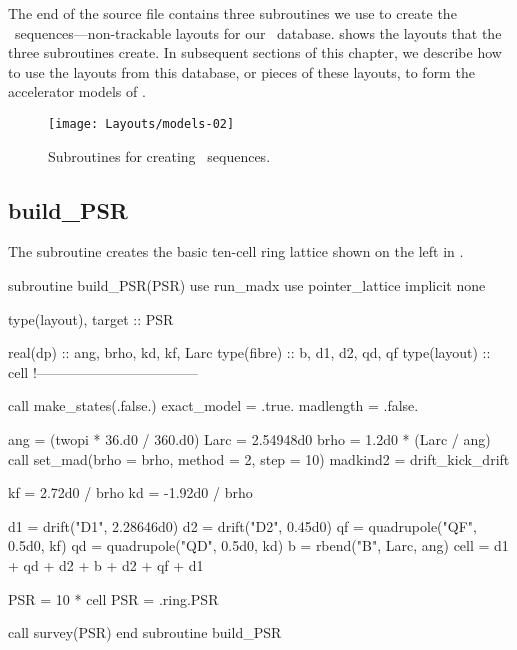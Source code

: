 %
The end of the  source file contains three
subroutines we use to create the \DNA\ sequences---non-trackable
layouts for our \DNA\ database.  shows the
layouts that the three subroutines create. In subsequent sections
of this chapter, we describe how to use the layouts from this database,
or pieces of these layouts, to form the accelerator models of
.

\begin{figure}[ht]
  \centering
  \texttt{[image: Layouts/models-02]}
  \caption{Subroutines for creating \DNA\ sequences.}
  \label{fig:DNA.subrtns}
\end{figure}


\subsection{build\_PSR}
\label{sec:build.psr}

%
The subroutine  creates the basic ten-cell ring
lattice shown on the left in .

\begin{ptccode}
subroutine  build_PSR(PSR)
use run_madx
use pointer_lattice
implicit none

type(layout), target :: PSR

real(dp) :: ang, brho, kd, kf, Larc
type(fibre) :: b, d1, d2, qd, qf
type(layout) :: cell
!-----------------------------------

call make_states(.false.)       \label{lin:bptc.psrstates}
exact_model = .true.
madlength = .false.             \label{lin:eptc.psrstates}

ang = (twopi * 36.d0 / 360.d0)
Larc = 2.54948d0
brho = 1.2d0 * (Larc / ang)
call set_mad(brho = brho, method = 2, step = 10) \label{lin:psr.setmad}
madkind2 = drift_kick_drift

kf =  2.72d0 / brho
kd = -1.92d0 / brho

d1 = drift("D1", 2.28646d0)     \label{lin:bptc.psrlatt}
d2 = drift("D2", 0.45d0)
qf = quadrupole("QF", 0.5d0, kf)
qd = quadrupole("QD", 0.5d0, kd)
b  = rbend("B", Larc, ang) \label{lin:psr.bend}
cell = d1 + qd + d2 + b + d2 + qf + d1 \label{lin:eptc.psrlatt}

PSR = 10 * cell
PSR = .ring.PSR                 \label{lin:psr.ring}

call survey(PSR)                \label{lin:psr.survey}
end subroutine build_PSR
\end{ptccode}

